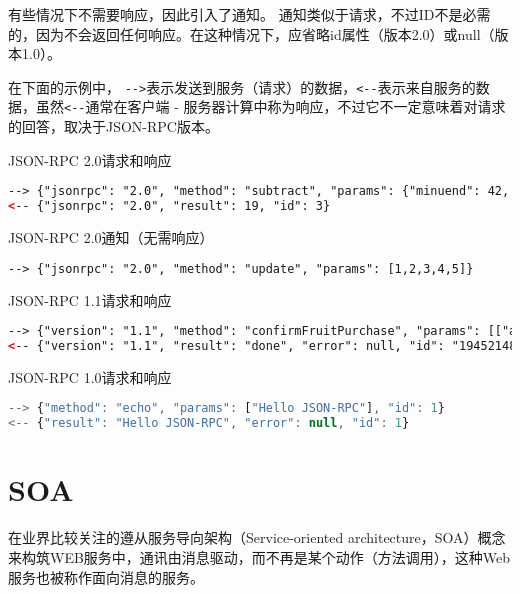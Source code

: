 有些情况下不需要响应，因此引入了通知。 通知类似于请求，不过ID不是必需的，因为不会返回任何响应。在这种情况下，应省略id属性（版本2.0）或null（版本1.0）。

在下面的示例中， \texttt{-\/->}表示发送到服务（请求）的数据，\texttt{<-\/-}表示来自服务的数据，虽然\texttt{<-\/-}通常在客户端 - 服务器计算中称为响应，不过它不一定意味着对请求的回答，取决于JSON-RPC版本。

\begin{example}
JSON-RPC 2.0请求和响应
\begin{lstlisting}[language=XML]
--> {"jsonrpc": "2.0", "method": "subtract", "params": {"minuend": 42, "subtrahend": 23}, "id": 3}
<-- {"jsonrpc": "2.0", "result": 19, "id": 3}
\end{lstlisting}
\end{example}

\begin{example}
JSON-RPC 2.0通知（无需响应）
\begin{lstlisting}[language=XML]
--> {"jsonrpc": "2.0", "method": "update", "params": [1,2,3,4,5]}
\end{lstlisting}
\end{example}

\begin{example}
JSON-RPC 1.1请求和响应
\begin{lstlisting}[language=XML]
--> {"version": "1.1", "method": "confirmFruitPurchase", "params": [["apple", "orange", "mangoes"], 1.123], "id": "194521489"}
<-- {"version": "1.1", "result": "done", "error": null, "id": "194521489"}
\end{lstlisting}
\end{example}


\begin{example}
JSON-RPC 1.0请求和响应
\begin{lstlisting}[language=JavaScript]
--> {"method": "echo", "params": ["Hello JSON-RPC"], "id": 1}
<-- {"result": "Hello JSON-RPC", "error": null, "id": 1}
\end{lstlisting}
\end{example}


\section{SOA}

在业界比较关注的遵从服务导向架构（Service-oriented architecture，SOA）概念来构筑WEB服务中，通讯由消息驱动，而不再是某个动作（方法调用），这种Web服务也被称作面向消息的服务。


